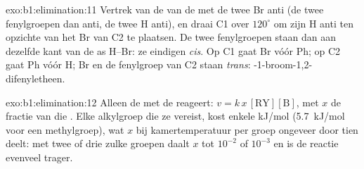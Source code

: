 \begin{solution}{exo:b1:elimination:11}
Vertrek van de  van de  met de twee Br anti (de
twee fenylgroepen dan anti, de twee H anti), en draai C1 over
$120^\circ$ om zijn H anti ten opzichte van het Br van C2 te plaatsen. De
twee fenylgroepen staan dan aan dezelfde kant van de as H--Br: ze eindigen
\textit{cis}. Op C1 gaat Br vóór Ph; op C2 gaat Ph vóór H; Br en de
fenylgroep van C2 staan \textit{trans}:
-1-broom-1,2-difenyletheen.
\end{solution}

\begin{solution}{exo:b1:elimination:12}
Alleen de  met de   reageert:
$v = k\,x\,[\mathrm{RY}][\mathrm{B}]$, met $x$ de fractie van die .
Elke  alkylgroep die ze vereist, kost enkele kJ/mol
(\qty{5.7}{kJ/mol} voor een methylgroep), wat $x$ bij kamertemperatuur
per groep ongeveer door tien deelt: met twee of drie zulke groepen daalt
$x$ tot $10^{-2}$ of $10^{-3}$ en is de reactie evenveel trager.
\end{solution}

